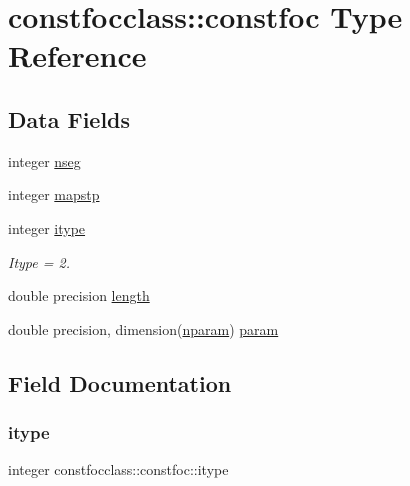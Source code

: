 \hypertarget{structconstfocclass_1_1constfoc}{}\section{constfocclass\+::constfoc Type Reference}
\label{structconstfocclass_1_1constfoc}
\subsection*{Data Fields}
\begin{DoxyCompactItemize}
\item 
integer \mbox{\hyperlink{structconstfocclass_1_1constfoc_ad5d129a88d9e84629813d001b6379bf5}{nseg}}
\item 
integer \mbox{\hyperlink{structconstfocclass_1_1constfoc_a7211bb49a75643cd5898f13851eb852e}{mapstp}}
\item 
integer \mbox{\hyperlink{structconstfocclass_1_1constfoc_a6805e237c322783df518e8f2c3e1feec}{itype}}
\begin{DoxyCompactList}\small\item\em Itype = 2. \end{DoxyCompactList}\item 
double precision \mbox{\hyperlink{structconstfocclass_1_1constfoc_a20a95ee3a0c6fd8f128d4fbe911077db}{length}}
\item 
double precision, dimension(\mbox{\hyperlink{namespaceconstfocclass_a4a04b85ebc26340b40e7c38cfad62bc1}{nparam}}) \mbox{\hyperlink{structconstfocclass_1_1constfoc_a91cddf45b9010e35e24ae6cd063a9ee7}{param}}
\end{DoxyCompactItemize}


\subsection{Field Documentation}
\mbox{\label{structconstfocclass_1_1constfoc_a6805e237c322783df518e8f2c3e1feec}} 
\subsubsection{\texorpdfstring{itype}{itype}}
{\footnotesize\ttfamily integer constfocclass\+::constfoc\+::itype}



